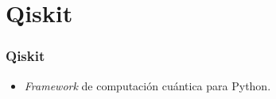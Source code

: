 \documentclass{beamer}
\begin{document}

\section{Qiskit}
\begin{frame}
	\frametitle{Qiskit}
	\begin{itemize}
 	\item \textit{Framework} de computación cuántica para Python.
	\end{itemize}
\end{frame}
\end{document}
